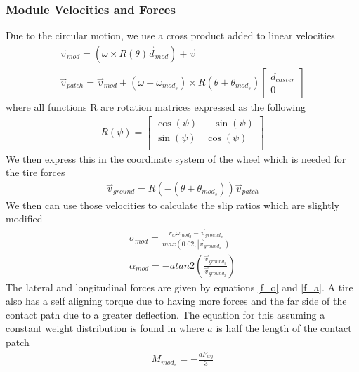 \documentclass{article}
\newcommand{\harpoon}{\overset{\rightharpoonup}}
\begin{document}
\subsubsection{Module Velocities and Forces}
Due to the circular motion, we use a cross product added to linear velocities
\begin{gather}
    \harpoon{v}_{mod} = \left(\omega \times R\left(\theta\right)\harpoon{d}_{mod}\right) + \harpoon{v}\\
    \harpoon{v}_{patch} = \harpoon{v}_{mod} +  \left(\omega + \omega_{mod_s}\right) \times R\left(\theta + \theta_{mod_s}\right)
    \begin{bmatrix}
        d_{caster} \\
        0
    \end{bmatrix}
\end{gather}
where all functions R are rotation matrices expressed as the following
\begin{gather}
    R(\psi) =
    \begin{bmatrix}
        \cos(\psi) & -\sin(\psi) \\
        \sin(\psi) & \cos(\psi)  \\
    \end{bmatrix}
\end{gather}
We then express this in the coordinate system of the wheel which is needed for the tire forces
\begin{gather}
    \harpoon{v}_{ground} = R(-(\theta + \theta_{mod_s}))\harpoon{v}_{patch}
\end{gather}
We then can use those velocities to calculate the slip ratios which are slightly modified
\begin{gather}
    \sigma_{mod} = \frac{r_w\omega_{mod_d} - \harpoon{v}_{ground_x}}{max(0.02, |\harpoon{v}_{ground_x}|)}\\
    \alpha_{mod} = -atan2(\frac{\harpoon{v}_{ground_y}}{\harpoon{v}_{ground_x}})
\end{gather}
The lateral and longitudinal forces are given by equations \eqref{f_o} and \eqref{f_a}.
A tire also has a self aligning torque due to having more forces and the far side of the contact path due to a greater deflection. The equation for this assuming a constant weight distribution is found in \textcite{tire_basics} where $a$ is half the length of the contact patch
\begin{gather}
    M_{mod_s} = -\frac{aF_{wy}}{3}
\end{gather}
\end{document}
